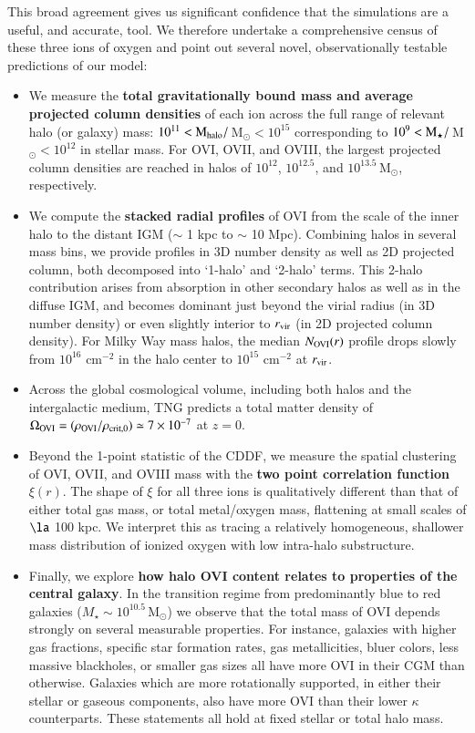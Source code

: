 \documentclass[useAMS,usenatbib]{mnras}
\newcommand{\msun}{\,M$_{\odot}$\xspace}
\newcommand{\ovi}{OVI\xspace}
\newcommand{\ovii}{OVII\xspace}
\newcommand{\oviii}{OVIII\xspace}
\begin{document}
This broad agreement gives us significant confidence that the simulations are a useful, and accurate, tool. We therefore undertake a comprehensive census of these three ions of oxygen and point out several novel, observationally testable predictions of our model:

\begin{itemize}
\item We measure the \textbf{total gravitationally bound mass and average projected column densities} of each ion across the full range of relevant halo (or galaxy) mass: \mbox{$10^{11} < \rm{M}_{\rm halo}/$\msun$ < 10^{15}$} corresponding to \mbox{$10^{9} < \rm{M}_{\rm \star}/$\msun$ < 10^{12}$} in stellar mass. For \ovi, \ovii, and \oviii, the largest projected column densities are reached in halos of $10^{12}$, $10^{12.5}$, and $10^{13.5}$\msun, respectively.
\item We compute the \textbf{stacked radial profiles} of \ovi from the scale of the inner halo to the distant IGM ($\sim$ 1 kpc to $\sim$ 10 Mpc). Combining halos in several mass bins, we provide profiles in 3D number density as well as 2D projected column, both decomposed into `1-halo' and `2-halo' terms. This 2-halo contribution arises from absorption in other secondary halos as well as in the diffuse IGM, and becomes dominant just beyond the virial radius (in 3D number density) or even slightly interior to $r_{\rm vir}$ (in 2D projected column density). For Milky Way mass halos, the median $N_{\rm OVI}(r)$ profile drops slowly from $10^{16}$ cm$^{-2}$ in the halo center to $10^{15}$ cm$^{-2}$ at $r_{\rm vir}$. 
\item Across the global cosmological volume, including both halos and the intergalactic medium, TNG predicts a total matter density of $\Omega_{\rm OVI} = (\rho_{\rm OVI} / \rho_{\rm crit,0}) \simeq 7 \times 10^{-7}$ at $z=0$.
\item Beyond the 1-point statistic of the CDDF, we measure the spatial clustering of \ovi, \ovii, and \oviii mass with the \textbf{two point correlation function} $\xi(r)$. The shape of $\xi$ for all three ions is qualitatively different than that of either total gas mass, or total metal/oxygen mass, flattening at small scales of $\la$ 100 kpc. We interpret this as tracing a relatively homogeneous, shallower mass distribution of ionized oxygen with low intra-halo substructure.
\item Finally, we explore \textbf{how halo \ovi content relates to properties of the central galaxy}. In the transition regime from predominantly blue to red galaxies ($M_\star \sim 10^{10.5}$\msun) we observe that the total mass of \ovi depends strongly on several measurable properties. For instance, galaxies with higher gas fractions, specific star formation rates, gas metallicities, bluer colors, less massive blackholes, or smaller gas sizes all have more \ovi in their CGM than otherwise. Galaxies which are more rotationally supported, in either their stellar or gaseous components, also have more \ovi than their lower $\kappa$ counterparts. These statements all hold at fixed stellar or total halo mass.
\end{itemize}
\end{document}
